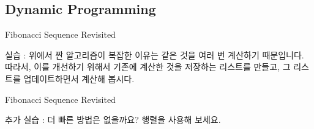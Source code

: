 \documentclass{beamer}
\begin{document}
\subsection{Dynamic Programming}

\begin{frame}{Fibonacci Sequence Revisited}

실습 : 위에서 짠 알고리즘이 복잡한 이유는 같은 것을 여러 번 계산하기 때문입니다. 따라서, 이를 개선하기 위해서 기존에 계산한 것을 저장하는 리스트를 만들고, 그 리스트를 업데이트하면서 계산해 봅시다. 
\end{frame}

\begin{frame}{Fibonacci Sequence Revisited} 

추가 실습 : 더 빠른 방법은 없을까요? 행렬을 사용해 보세요. 

\end{frame}
\end{document}
